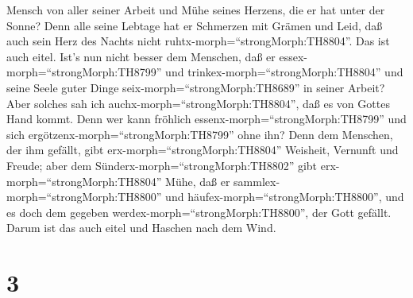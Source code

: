 Mensch von aller seiner Arbeit und Mühe seines Herzens, die er hat unter
der Sonne?  Denn alle seine Lebtage hat er Schmerzen mit
Grämen und Leid, daß auch sein Herz des Nachts nicht
ruhtx-morph=``strongMorph:TH8804''. Das ist auch eitel. 
Ist's nun nicht besser dem Menschen, daß er
essex-morph=``strongMorph:TH8799'' und
trinkex-morph=``strongMorph:TH8804'' und seine Seele guter Dinge
seix-morph=``strongMorph:TH8689'' in seiner Arbeit? Aber solches sah ich
auchx-morph=``strongMorph:TH8804'', daß es von Gottes Hand kommt.
 Denn wer kann fröhlich essenx-morph=``strongMorph:TH8799''
und sich ergötzenx-morph=``strongMorph:TH8799'' ohne ihn? 
Denn dem Menschen, der ihm gefällt, gibt
erx-morph=``strongMorph:TH8804'' Weisheit, Vernunft und Freude; aber dem
Sünderx-morph=``strongMorph:TH8802'' gibt
erx-morph=``strongMorph:TH8804'' Mühe, daß er
sammlex-morph=``strongMorph:TH8800'' und
häufex-morph=``strongMorph:TH8800'', und es doch dem gegeben
werdex-morph=``strongMorph:TH8800'', der Gott gefällt. Darum ist das
auch eitel und Haschen nach dem Wind.

\hypertarget{section-2}{%
\section{3}\label{section-2}}


